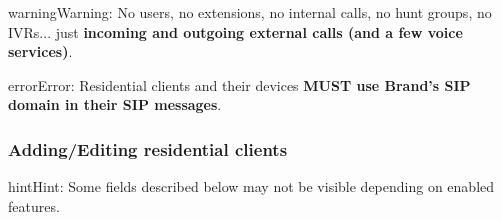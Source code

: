 \documentclass[letterpaper,10pt,english]{sphinxmanual}
\begin{document}
\begin{notice}{warning}{Warning:}
No users, no extensions, no internal calls, no hunt groups, no IVRs... just \textbf{incoming and outgoing external
calls (and a few voice services)}.
\end{notice}

\begin{notice}{error}{Error:}
Residential clients and their devices \textbf{MUST use Brand's SIP domain in their SIP messages}.
\end{notice}


\subsubsection{Adding/Editing residential clients}
\label{administration_portal/brand/clients/residential:adding-editing-residential-clients}
\begin{notice}{hint}{Hint:}
Some fields described below may not be visible depending on enabled features.
\end{notice}
\end{document}
